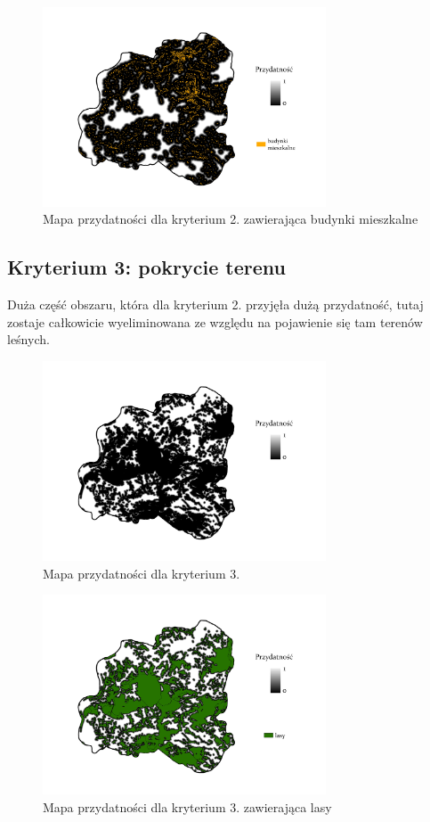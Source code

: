 \documentclass{article}
\begin{document}
\begin{figure}[H]
    \centering
    \includegraphics[width=0.75\textwidth]{img/plesna-kryterium2-budynki.jpg}
    \caption{Mapa przydatności dla kryterium 2. zawierająca budynki mieszkalne}
\end{figure}

\subsection{Kryterium 3: pokrycie terenu}
Duża część obszaru, która dla kryterium 2. przyjęła dużą przydatność, tutaj zostaje całkowicie wyeliminowana ze względu na pojawienie się tam terenów leśnych.

\begin{figure}[H]
    \centering
    \includegraphics[width=0.75\textwidth]{img/plesna-kryterium3-layout.jpg}
    \caption{Mapa przydatności dla kryterium 3.}
\end{figure}

\begin{figure}[H]
    \centering
    \includegraphics[width=0.75\textwidth]{img/plesna-kryterium3-lasy.jpg}
    \caption{Mapa przydatności dla kryterium 3. zawierająca lasy}
\end{figure}
\end{document}
